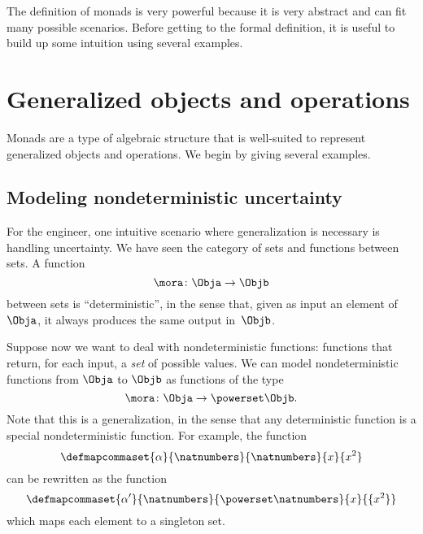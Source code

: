 
The definition of monads is very powerful because it is very abstract and can fit many possible scenarios.
Before getting to the formal definition, it is useful to build up some intuition using several examples.

\section{Generalized objects and operations}

Monads are a type of algebraic structure that is well-suited to represent generalized objects and operations.
We begin by giving several examples.

\subsection{Modeling nondeterministic uncertainty}

For the engineer, one intuitive scenario where generalization is necessary is handling uncertainty.
We have seen the category  \Set of sets and functions between sets.
A function
\begin{equation}
	\label{eq:monad-simple}
	\mora\colon\Obja\to\Objb
\end{equation}
between sets is ``deterministic'', in the sense that, given as input an element of~$\Obja$, it always produces the same output in~$\Objb$.

Suppose now we want to deal with nondeterministic functions: functions that return, for each input, a \emph{set} of possible values.
We can model nondeterministic functions from $\Obja$ to $\Objb$ as functions of the type
\begin{equation}
	\label{eq:monad-generalized}
	\mora\colon\Obja\to\powerset\Objb.
\end{equation}
%
Note that this is a generalization, in the sense that any deterministic function is a special nondeterministic function.
For example, the function
%
\begin{equation}
	\label{eq:monad-alpha-example1}
	\defmapcommaset{
		\alpha
	}{
		\natnumbers
	}{
		\natnumbers
	}{
		x
	}{
		x^2
	}
\end{equation}
%
can be rewritten as the function
%
\begin{equation}
	\label{eq:monad-alpha-example2}
	\defmapcommaset{
		\alpha'
	}{
		\natnumbers
	}{
		\powerset\natnumbers
	}{
		x
	}{
		\{x^2\}
	}
\end{equation}
%
which maps each element to a singleton set.

